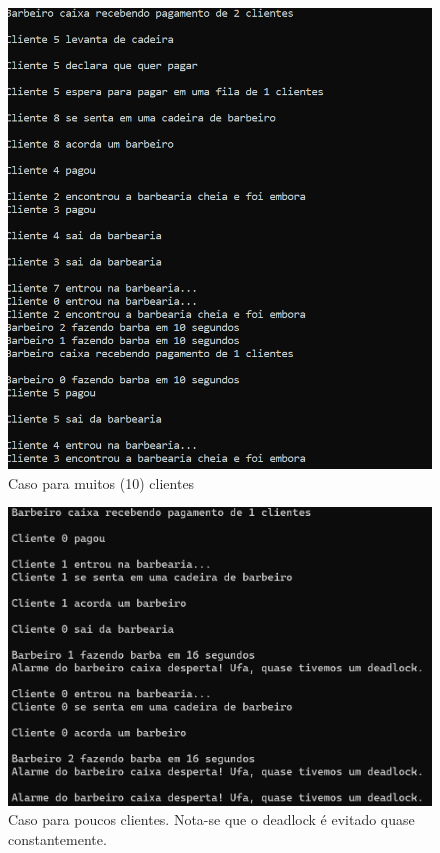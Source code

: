 \documentclass{article}
\begin{document}
\begin{figure}[H]
    \centering
    \includegraphics[scale=0.7]{10_clients.png}
    \caption{Caso para muitos (10) clientes}

\end{figure}

\begin{figure}[H]
    \centering
    \includegraphics[scale=0.7]{2_clients.png}
    \caption{Caso para poucos clientes. Nota-se que o deadlock é evitado quase constantemente.}

\end{figure}
\end{document}

